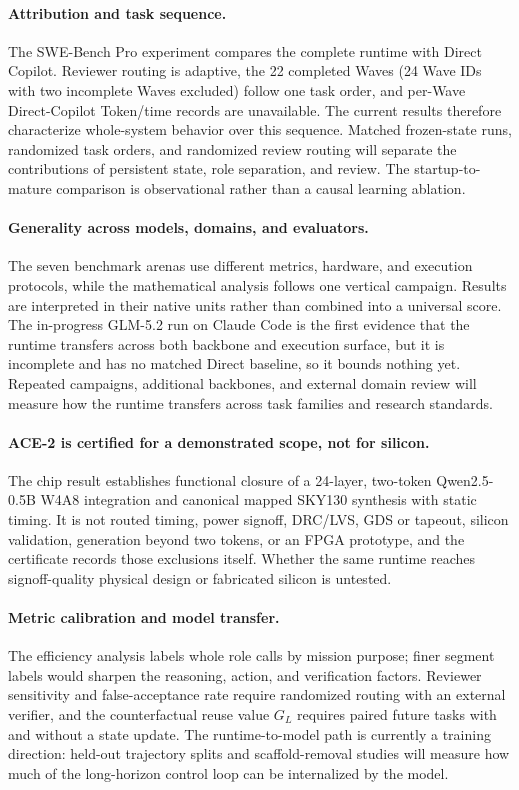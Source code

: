 \paragraph{Attribution and task sequence.}
The SWE-Bench Pro experiment compares the complete \systemname runtime with Direct
Copilot. Reviewer routing is adaptive, the 22 completed Waves (24 Wave IDs with two
incomplete Waves excluded) follow one task order, and
per-Wave Direct-Copilot Token/time records are unavailable. The current results
therefore characterize whole-system behavior over this sequence. Matched
frozen-state runs, randomized task orders, and randomized review routing will
separate the contributions of persistent state, role separation, and review. The
startup-to-mature comparison is observational rather than a causal learning ablation.

\paragraph{Generality across models, domains, and evaluators.}
The seven benchmark arenas use different metrics, hardware, and execution
protocols, while the mathematical analysis follows one vertical campaign. Results
are interpreted in their native units rather than combined into a universal score.
The in-progress GLM-5.2 run on Claude Code is the first evidence that the runtime
transfers across both backbone and execution surface, but it is incomplete and has
no matched Direct baseline, so it bounds nothing yet. Repeated campaigns,
additional backbones, and external domain review will measure how the runtime
transfers across task families and research standards.

\paragraph{ACE-2 is certified for a demonstrated scope, not for silicon.}
The chip result establishes functional closure of a 24-layer, two-token
Qwen2.5-0.5B W4A8 integration and canonical mapped SKY130 synthesis with static
timing. It is not routed timing, power signoff, DRC/LVS, GDS or tapeout, silicon
validation, generation beyond two tokens, or an FPGA prototype, and the
certificate records those exclusions itself. Whether the same runtime reaches
signoff-quality physical design or fabricated silicon is untested.

\paragraph{Metric calibration and model transfer.}
The efficiency analysis labels whole role calls by mission purpose; finer segment
labels would sharpen the reasoning, action, and verification factors. Reviewer
sensitivity and false-acceptance rate require randomized routing with an external
verifier, and the counterfactual reuse value $G_L$ requires paired future tasks with
and without a state update. The runtime-to-model path is currently a training
direction: held-out trajectory splits and scaffold-removal studies will measure how
much of the long-horizon control loop can be internalized by the model.

